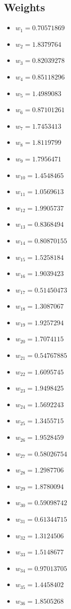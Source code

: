 \documentclass[11pt]{article}
\begin{document}
\subsection*{Weights}
\begin{itemize}
\item $w_{1} = 0.70571869$
\item $w_{2} = 1.8379764$
\item $w_{3} = 0.82039278$
\item $w_{4} = 0.85118296$
\item $w_{5} = 1.4989083$
\item $w_{6} = 0.87101261$
\item $w_{7} = 1.7453413$
\item $w_{8} = 1.8119799$
\item $w_{9} = 1.7956471$
\item $w_{10} = 1.4548465$
\item $w_{11} = 1.0569613$
\item $w_{12} = 1.9905737$
\item $w_{13} = 0.8368494$
\item $w_{14} = 0.80870155$
\item $w_{15} = 1.5258184$
\item $w_{16} = 1.9039423$
\item $w_{17} = 0.51450473$
\item $w_{18} = 1.3087067$
\item $w_{19} = 1.9257294$
\item $w_{20} = 1.7074115$
\item $w_{21} = 0.54767885$
\item $w_{22} = 1.6095745$
\item $w_{23} = 1.9498425$
\item $w_{24} = 1.5692243$
\item $w_{25} = 1.3455715$
\item $w_{26} = 1.9528459$
\item $w_{27} = 0.58026754$
\item $w_{28} = 1.2987706$
\item $w_{29} = 1.8780094$
\item $w_{30} = 0.59098742$
\item $w_{31} = 0.61344715$
\item $w_{32} = 1.3124506$
\item $w_{33} = 1.5148677$
\item $w_{34} = 0.97013705$
\item $w_{35} = 1.4458402$
\item $w_{36} = 1.8505268$

\end{itemize}
\end{document}
